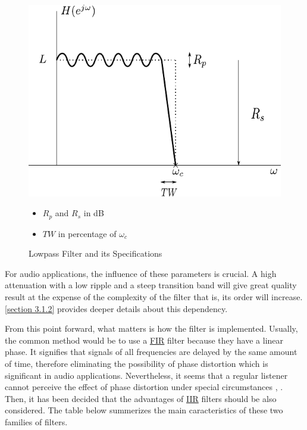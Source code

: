\begin{figure}[ht]
\noindent\begin{minipage}{0.6\textwidth}
	\includegraphics[scale=0.65]{filter_specs.pdf}
	\raggedleft
	
\end{minipage}%
\hfill%
\begin{minipage}{0.35\textwidth}\raggedright
	\begin{itemize}
		\item $R_p$ and $R_s$ in \si{dB}
		\item $TW$ in percentage of $\omega_c$
	\end{itemize}
\end{minipage}
\caption{Lowpass Filter and its Specifications}\label{Figure 3.5}
\end{figure}
\newpage

For audio applications, the influence of these parameters is crucial. A high attenuation with a low ripple and a steep transition band will give great quality result at the expense of the complexity of the filter that is, its order will increase. \ref{section 3.1.2} provides deeper details about this dependency.  

From this point forward, what matters is how the filter is implemented. Usually, the common method would be to use a \hyperlink{FIR}{FIR} filter because they have a linear phase. It signifies that signals of all frequencies are delayed by the same amount of time, therefore eliminating the possibility of phase distortion which is significant in audio applications. Nevertheless, it seems \cite{toole} that a regular listener cannot perceive the effect of phase distortion under special circumstances \cite{hartmann}, \cite{lipshitz}. Then, it has been decided that the advantages of \hyperlink{IIR}{IIR} filters should be also considered. The table below summerizes the main caracteristics of these two families of filters.

